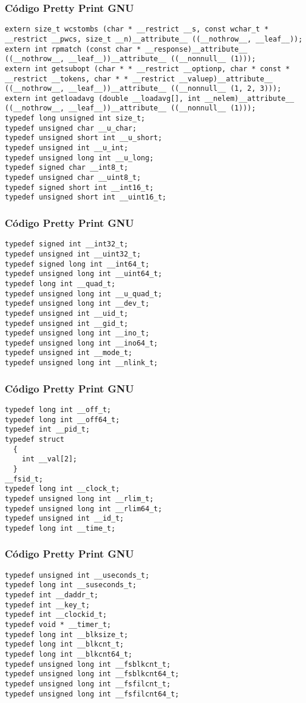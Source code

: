 \documentclass{beamer}
\begin{document}
\begin{frame}[fragile]
\frametitle{C\'odigo Pretty Print GNU}
\begin{verbatim}
extern size_t wcstombs (char * __restrict __s, const wchar_t * __restrict __pwcs, size_t __n)__attribute__ ((__nothrow__, __leaf__));
extern int rpmatch (const char * __response)__attribute__ ((__nothrow__, __leaf__))__attribute__ ((__nonnull__ (1)));
extern int getsubopt (char * * __restrict __optionp, char * const * __restrict __tokens, char * * __restrict __valuep)__attribute__ ((__nothrow__, __leaf__))__attribute__ ((__nonnull__ (1, 2, 3)));
extern int getloadavg (double __loadavg[], int __nelem)__attribute__ ((__nothrow__, __leaf__))__attribute__ ((__nonnull__ (1)));
typedef long unsigned int size_t;
typedef unsigned char __u_char;
typedef unsigned short int __u_short;
typedef unsigned int __u_int;
typedef unsigned long int __u_long;
typedef signed char __int8_t;
typedef unsigned char __uint8_t;
typedef signed short int __int16_t;
typedef unsigned short int __uint16_t;
\end{verbatim}
\end{frame}
\begin{frame}[fragile]
\frametitle{C\'odigo Pretty Print GNU}
\begin{verbatim}
typedef signed int __int32_t;
typedef unsigned int __uint32_t;
typedef signed long int __int64_t;
typedef unsigned long int __uint64_t;
typedef long int __quad_t;
typedef unsigned long int __u_quad_t;
typedef unsigned long int __dev_t;
typedef unsigned int __uid_t;
typedef unsigned int __gid_t;
typedef unsigned long int __ino_t;
typedef unsigned long int __ino64_t;
typedef unsigned int __mode_t;
typedef unsigned long int __nlink_t;
\end{verbatim}
\end{frame}
\begin{frame}[fragile]
\frametitle{C\'odigo Pretty Print GNU}
\begin{verbatim}
typedef long int __off_t;
typedef long int __off64_t;
typedef int __pid_t;
typedef struct
  {
    int __val[2];
  }
__fsid_t;
typedef long int __clock_t;
typedef unsigned long int __rlim_t;
typedef unsigned long int __rlim64_t;
typedef unsigned int __id_t;
typedef long int __time_t;
\end{verbatim}
\end{frame}
\begin{frame}[fragile]
\frametitle{C\'odigo Pretty Print GNU}
\begin{verbatim}
typedef unsigned int __useconds_t;
typedef long int __suseconds_t;
typedef int __daddr_t;
typedef int __key_t;
typedef int __clockid_t;
typedef void * __timer_t;
typedef long int __blksize_t;
typedef long int __blkcnt_t;
typedef long int __blkcnt64_t;
typedef unsigned long int __fsblkcnt_t;
typedef unsigned long int __fsblkcnt64_t;
typedef unsigned long int __fsfilcnt_t;
typedef unsigned long int __fsfilcnt64_t;
\end{verbatim}
\end{frame}
\end{document}
